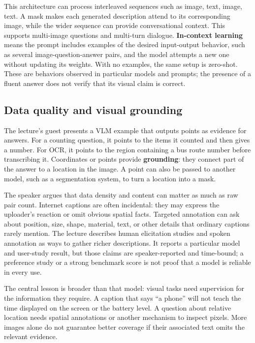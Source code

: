 This architecture can process interleaved sequences such as image, text, image, text. A mask makes each generated description attend to its corresponding image, while the wider sequence can provide conversational context. This supports multi-image questions and multi-turn dialogue. \textbf{In-context learning} means the prompt includes examples of the desired input-output behavior, such as several image-question-answer pairs, and the model attempts a new one without updating its weights. With no examples, the same setup is zero-shot. These are behaviors observed in particular models and prompts; the presence of a fluent answer does not verify that its visual claim is correct.

\subsection{Data quality and visual grounding}\label{04-visual-computing-ii-ch031-data-quality-and-visual-grounding}

\hypertarget{04-visual-computing-ii-ch031-data-quality-and-visual-grounding}{}

The lecture's guest presents a VLM example that outputs points as evidence for answers. For a counting question, it points to the items it counted and then gives a number. For OCR, it points to the region containing a bus route number before transcribing it. Coordinates or points provide \textbf{grounding}: they connect part of the answer to a location in the image. A point can also be passed to another model, such as a segmentation system, to turn a location into a mask.

The speaker argues that data density and content can matter as much as raw pair count. Internet captions are often incidental: they may express the uploader's reaction or omit obvious spatial facts. Targeted annotation can ask about position, size, shape, material, text, or other details that ordinary captions rarely mention. The lecture describes human elicitation studies and spoken annotation as ways to gather richer descriptions. It reports a particular model and user-study result, but those claims are speaker-reported and time-bound; a preference study or a strong benchmark score is not proof that a model is reliable in every use.

The central lesson is broader than that model: visual tasks need supervision for the information they require. A caption that says ``a phone'' will not teach the time displayed on the screen or the battery level. A question about relative location needs spatial annotations or another mechanism to inspect pixels. More images alone do not guarantee better coverage if their associated text omits the relevant evidence.

